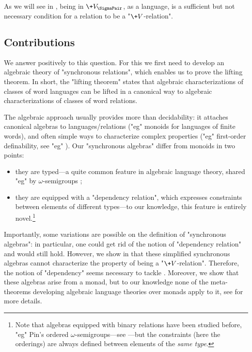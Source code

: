 As we will see in , being in $\+V_{\SigmaPair}$, as a language,
is a sufficient but not necessary condition for a relation to be a "$\+V$-relation".

\subsection{Contributions}

We answer positively to this question.
For this we first need to develop an algebraic theory of "synchronous relations",
which enables us to prove the lifting theorem. In short, the "lifting theorem" states that algebraic characterizations of classes of word languages can be lifted in a canonical way to algebraic characterizations of classes of word relations.

The algebraic approach usually provides more than decidability: it attaches
canonical algebras to languages/relations ("eg" monoids for languages of finite words), and often simple ways to characterize complex properties ("eg" first-order definability, see "eg" \cite[Theorem 2.6, p.~40]{bojanczyk_languages_2020}).
Our "synchronous algebras" differ from monoids in two points:
\begin{itemize}
	\item they are typed---a quite common feature in algebraic language theory, shared "eg" by $\omega$-semigroups \cite[\S 4.1, p.~91]{perrin_infinite_2004};
	\item they are equipped with a "dependency relation", which expresses constraints between 
	elements of different types---to our knowledge, this feature is entirely novel.\footnote{Note that algebras equipped with binary relations have been studied before, "eg" Pin's ordered 
	$\omega$-semigroups---see \cite[\S 2.4, p.~7]{pin_positive_1998}---but the constraints (here the 
	orderings) are always defined between elements of the \emph{same type}.}
\end{itemize}

Importantly, some variations are possible on the definition of "synchronous algebras":
in particular, one could get rid of the notion of "dependency relation" and 
 would still hold.
However, we show in  that these
simplified synchronous algebras cannot characterize the property of being a "$\+V$-relation".
Therefore, the notion of "dependency" seems necessary to tackle .
Moreover, we show that these algebras arise from a monad, but to our knowledge none of the 
meta-theorems developing algebraic language theories over monads apply to it,
see  for more details.

